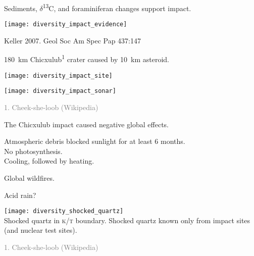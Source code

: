 \documentclass[t]{beamer}
\newcommand{\backskip}{\vspace{-0.5\baselineskip}}
\begin{document}


\begin{frame}{Sediments, $\delta$\textsuperscript{13}C, and foraminiferan changes support impact.}


\centering


\texttt{[image: diversity\_impact\_evidence]}
	
\tinyfill Keller 2007. Geol Soc Am Spec Pap 437:147

\end{frame}




\begin{frame}{180~km Chicxulub\textsuperscript{1} crater caused by 10~km asteroid.}

\backskip

\begin{multicols}{2}

\texttt{[image: diversity\_impact\_site]}

\columnbreak

\texttt{[image: diversity\_impact\_sonar]}
\end{multicols}

\centering

\vfilll
	
\tiny \textcolor{gray}{1. Cheek-she-loob (Wikipedia)}


\end{frame}


\begin{frame}{The Chicxulub impact caused negative global effects.}

\backskip

\begin{multicols}{2}

\hangpara Atmospheric debris blocked sunlight for at least 6 months.
\\
\hspace*{1em} No photosynthesis.
\\
\hspace*{1em} Cooling, followed by heating.

\hangpara Global wildfires.

\hangpara Acid rain?

\columnbreak

\noindent \texttt{[image: diversity\_shocked\_quartz]}\\
\noindent Shocked quartz in \textsc{k/t} boundary. Shocked quartz known only from impact sites (and nuclear test sites).


\end{multicols}

\vfilll
	
\tiny \textcolor{gray}{1. Cheek-she-loob (Wikipedia)}

\end{frame}
\end{document}
